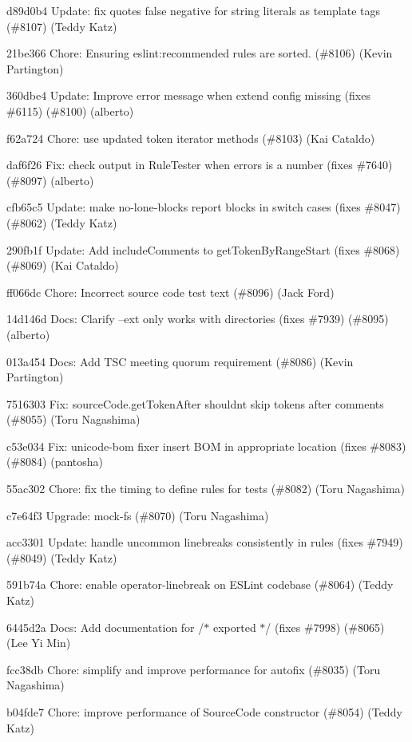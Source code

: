 \begin{DoxyItemize}
\item d89d0b4 Update\+: fix quotes false negative for string literals as template tags (\#8107) (Teddy Katz)
\item 21be366 Chore\+: Ensuring eslint\+:recommended rules are sorted. (\#8106) (Kevin Partington)
\item 360dbe4 Update\+: Improve error message when extend config missing (fixes \#6115) (\#8100) (alberto)
\item f62a724 Chore\+: use updated token iterator methods (\#8103) (Kai Cataldo)
\item daf6f26 Fix\+: check output in Rule\+Tester when errors is a number (fixes \#7640) (\#8097) (alberto)
\item cfb65c5 Update\+: make no-\/lone-\/blocks report blocks in switch cases (fixes \#8047) (\#8062) (Teddy Katz)
\item 290fb1f Update\+: Add include\+Comments to get\+Token\+By\+Range\+Start (fixes \#8068) (\#8069) (Kai Cataldo)
\item ff066dc Chore\+: Incorrect source code test text (\#8096) (Jack Ford)
\item 14d146d Docs\+: Clarify --ext only works with directories (fixes \#7939) (\#8095) (alberto)
\item 013a454 Docs\+: Add T\+SC meeting quorum requirement (\#8086) (Kevin Partington)
\item 7516303 Fix\+: {\ttfamily source\+Code.\+get\+Token\+After} shouldn\textquotesingle{}t skip tokens after comments (\#8055) (Toru Nagashima)
\item c53e034 Fix\+: unicode-\/bom fixer insert B\+OM in appropriate location (fixes \#8083) (\#8084) (pantosha)
\item 55ac302 Chore\+: fix the timing to define rules for tests (\#8082) (Toru Nagashima)
\item c7e64f3 Upgrade\+: mock-\/fs (\#8070) (Toru Nagashima)
\item acc3301 Update\+: handle uncommon linebreaks consistently in rules (fixes \#7949) (\#8049) (Teddy Katz)
\item 591b74a Chore\+: enable operator-\/linebreak on E\+S\+Lint codebase (\#8064) (Teddy Katz)
\item 6445d2a Docs\+: Add documentation for /$\ast$ exported $\ast$/ (fixes \#7998) (\#8065) (Lee Yi Min)
\item fcc38db Chore\+: simplify and improve performance for autofix (\#8035) (Toru Nagashima)
\item b04fde7 Chore\+: improve performance of Source\+Code constructor (\#8054) (Teddy Katz)

\end{DoxyItemize}
